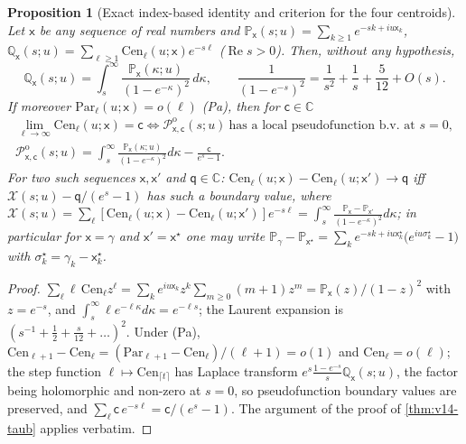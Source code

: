 \documentclass[11pt,a4paper]{article}
\numberwithin{equation}{section}
\newtheorem{proposition}[theorem]{Proposition}
\theoremstyle{definition}
\theoremstyle{remark}
\begin{document}
\begin{proposition}[Exact index-based identity and criterion for the four centroids]\label{prop:v14-index}
Let $\mathsf x$ be any sequence of real numbers and $\mathbb P_{\mathsf x}(s;u)=\sum_{k\ge1}e^{-sk+iu\mathsf x_k}$, $\mathbb Q_{\mathsf x}(s;u)=\sum_{\ell\ge1}\mathrm{Cen}_\ell(u;\mathsf x)e^{-s\ell}$ ($\operatorname{Re}s>0$). Then, without any hypothesis,
\begin{equation}\label{eq:v14-Q}
\mathbb Q_{\mathsf x}(s;u)=\int_s^\infty\frac{\mathbb P_{\mathsf x}(\kappa;u)}{(1-e^{-\kappa})^2}\,d\kappa,\qquad\frac1{(1-e^{-s})^2}=\frac1{s^2}+\frac1s+\frac5{12}+O(s).
\end{equation}
If moreover $\mathrm{Par}_\ell(u;\mathsf x)=o(\ell)$ (Pa), then for $\mathsf c\in\mathbb C$
\begin{equation}
\begin{gathered}
\lim_{\ell\to\infty}\mathrm{Cen}_\ell(u;\mathsf x)=\mathsf c\iff\mathscr P^{\mathrm o}_{\mathsf x,\mathsf c}(s;u)\ \text{has a local pseudofunction b.v.\ at }s=0,\\
\mathscr P^{\mathrm o}_{\mathsf x,\mathsf c}(s;u)=\int_s^\infty\frac{\mathbb P_{\mathsf x}(\kappa;u)}{(1-e^{-\kappa})^2}d\kappa-\frac{\mathsf c}{e^s-1}.
\end{gathered}
\end{equation}
For two such sequences $\mathsf x,\mathsf x'$ and $\mathsf q\in\mathbb C$: $\mathrm{Cen}_\ell(u;\mathsf x)-\mathrm{Cen}_\ell(u;\mathsf x')\to\mathsf q$ iff $\mathscr X(s;u)-\mathsf q/(e^s-1)$ has such a boundary value, where $\mathscr X(s;u)=\sum_\ell[\mathrm{Cen}_\ell(u;\mathsf x)-\mathrm{Cen}_\ell(u;\mathsf x')]e^{-s\ell}=\int_s^\infty\frac{\mathbb P_{\mathsf x}-\mathbb P_{\mathsf x'}}{(1-e^{-\kappa})^2}d\kappa$; in particular for $\mathsf x=\gamma$ and $\mathsf x'=\mathsf x^\star$ one may write $\mathbb P_\gamma-\mathbb P_{\mathsf x^\star}=\sum_ke^{-sk+iu\mathsf x^\star_k}\bigl(e^{iu\sigma_k^\star}-1\bigr)$ with $\sigma_k^\star=\gamma_k-\mathsf x^\star_k$.
\end{proposition}
\begin{proof}
$\sum_\ell\ell\,\mathrm{Cen}_\ell z^\ell=\sum_ke^{iu\mathsf x_k}z^k\sum_{m\ge0}(m+1)z^m=\mathbb P_{\mathsf x}(z)/(1-z)^2$ with $z=e^{-s}$, and $\int_s^\infty\ell e^{-\ell\kappa}d\kappa=e^{-\ell s}$; the Laurent expansion is $(s^{-1}+\frac12+\frac s{12}+\dots)^2$. Under (Pa), $\mathrm{Cen}_{\ell+1}-\mathrm{Cen}_\ell=(\mathrm{Par}_{\ell+1}-\mathrm{Cen}_\ell)/(\ell+1)=o(1)$ and $\mathrm{Cen}_\ell=o(\ell)$; the step function $\ell\mapsto\mathrm{Cen}_{\lceil t\rceil}$ has Laplace transform $e^{s}\frac{1-e^{-s}}s\mathbb Q_{\mathsf x}(s;u)$, the factor being holomorphic and non-zero at $s=0$, so pseudofunction boundary values are preserved, and $\sum_\ell\mathsf c\,e^{-s\ell}=\mathsf c/(e^s-1)$. The argument of the proof of \cref{thm:v14-taub} applies verbatim.
\end{proof}
\end{document}
